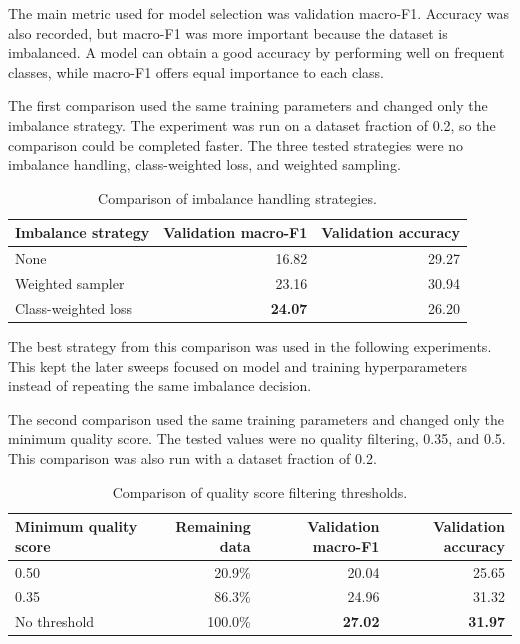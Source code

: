 The main metric used for model selection was validation macro-F1. Accuracy was also recorded, but macro-F1 was more important because the dataset is imbalanced. A model can obtain a good accuracy by performing well on frequent classes, while macro-F1 offers equal importance to each class.

The first comparison used the same training parameters and changed only the imbalance strategy. The experiment was run on a dataset fraction of 0.2, so the comparison could be completed faster. The three tested strategies were no imbalance handling, class-weighted loss, and weighted sampling.

\begin{table}[h]
    \centering
    \begin{tabular}{lrr}
        \hline
        Imbalance strategy & Validation macro-F1 & Validation accuracy \\
        \hline
        None & 16.82 & 29.27 \\
        Weighted sampler & 23.16 & 30.94 \\
        Class-weighted loss & \textbf{24.07} & 26.20 \\
        \hline
    \end{tabular}
    \caption{Comparison of imbalance handling strategies.}
    \label{tab:imbalance-strategy-comparison}
\end{table}

The best strategy from this comparison was used in the following experiments. This kept the later sweeps focused on model and training hyperparameters instead of repeating the same imbalance decision.

The second comparison used the same training parameters and changed only the minimum quality score. The tested values were no quality filtering, 0.35, and 0.5. This comparison was also run with a dataset fraction of 0.2.

\begin{table}[h]
    \centering
    \begin{tabular}{lrrr}
        \hline
        Minimum quality score & Remaining data & Validation macro-F1 & Validation accuracy \\
        \hline
        0.50 & 20.9\% & 20.04 & 25.65 \\
        0.35 & 86.3\% & 24.96 & 31.32 \\
        No threshold & 100.0\% & \textbf{27.02} & \textbf{31.97} \\
        \hline
    \end{tabular}
    \caption{Comparison of quality score filtering thresholds.}
    \label{tab:quality-filtering-comparison}
\end{table}

